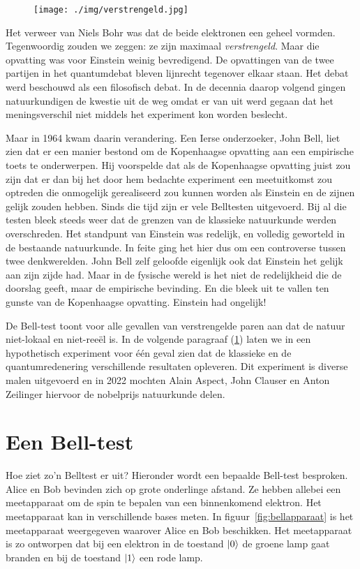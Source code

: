 \documentclass[../../main.tex]{subfiles}
\begin{document}
\begin{figure}
\centering
\texttt{[image: ./img/verstrengeld.jpg]}
\end{figure}

Het verweer van Niels Bohr was dat de beide elektronen een geheel vormden. Tegenwoordig zouden we zeggen: ze zijn maximaal \textit{verstrengeld}. Maar die opvatting was voor Einstein weinig bevredigend. De opvattingen van de twee partijen in het quantumdebat bleven lijnrecht tegenover elkaar staan. Het debat werd beschouwd als een filosofisch debat. In de decennia daarop volgend gingen  natuurkundigen de kwestie uit de weg omdat er van uit werd gegaan dat het meningsverschil niet middels het experiment kon worden beslecht. 

Maar in 1964 kwam daarin verandering. Een Ierse onderzoeker, John Bell, liet zien dat er een manier bestond om de Kopenhaagse opvatting aan een empirische toets te onderwerpen. Hij voorspelde dat als de Kopenhaagse opvatting juist zou zijn dat er dan bij het door hem bedachte experiment een meetuitkomst zou optreden die onmogelijk gerealiseerd zou kunnen worden als Einstein en de zijnen gelijk zouden hebben. Sinds die tijd zijn er vele Belltesten uitgevoerd. Bij al die testen bleek steeds weer dat de grenzen van de klassieke natuurkunde werden overschreden. Het standpunt van Einstein was redelijk, en volledig geworteld in de bestaande natuurkunde. In feite ging het hier dus om een controverse tussen twee denkwerelden. John Bell zelf geloofde eigenlijk ook dat Einstein het gelijk aan zijn zijde had. Maar in de fysische wereld is het niet de redelijkheid die de doorslag geeft, maar de empirische bevinding. En die bleek uit te vallen ten gunste van de  Kopenhaagse opvatting. Einstein had ongelijk! 

De Bell-test toont voor alle gevallen van verstrengelde paren aan dat de natuur niet-lokaal en niet-ree\"el is. In de volgende paragraaf  (\ref{sec:belltest}) laten we in een hypothetisch experiment voor \'e\'en geval zien dat de klassieke en de quantumredenering verschillende resultaten opleveren. Dit experiment is diverse malen uitgevoerd en in 2022 mochten Alain Aspect, John Clauser en Anton Zeilinger hiervoor de nobelprijs natuurkunde delen.

\section{Een Bell-test}\label{sec:belltest}
Hoe ziet zo'n Belltest er uit? Hieronder wordt een bepaalde Bell-test besproken. Alice en Bob bevinden zich op grote onderlinge afstand. Ze hebben allebei een meetapparaat om de spin te bepalen van een binnenkomend elektron. Het meetapparaat kan in verschillende bases meten. In figuur~\ref{fig:bellapparaat} is het meetapparaat weergegeven waarover Alice en Bob beschikken. Het meetapparaat is zo ontworpen dat bij een elektron in de toestand  $\ket{0}$ de groene lamp gaat branden en bij de toestand  $\ket{1}$ een rode lamp.
\end{document}

